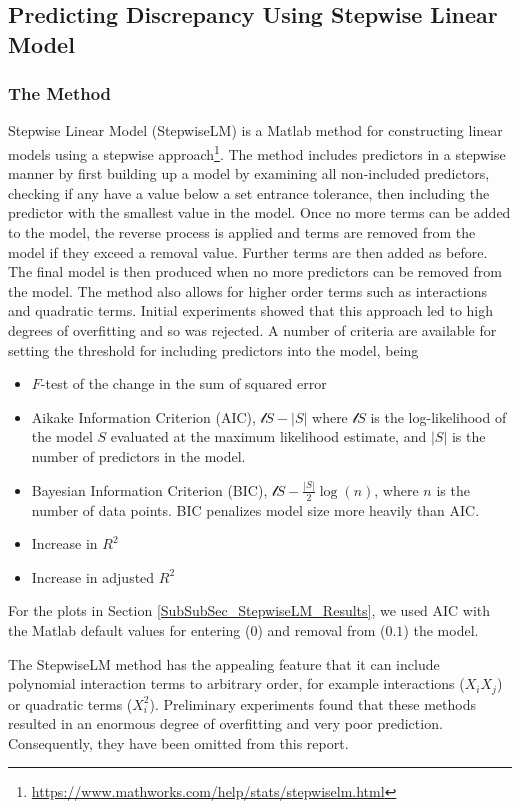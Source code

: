 \documentclass[11pt,a4paper,oneside]{article}
\begin{document}
\clearpage

\subsection{Predicting Discrepancy Using Stepwise Linear Model}\label{SubSec_StepwiseLM_Discrepancy}
\subsubsection{The Method}
Stepwise Linear Model (StepwiseLM) is a Matlab method for constructing linear models using a stepwise approach\footnote{\url{https://www.mathworks.com/help/stats/stepwiselm.html}}. The method includes predictors in a stepwise manner by first building  up a model by examining all non-included predictors, checking if any have a value below a set entrance tolerance, then including the predictor with the smallest value in the model. Once no more terms can be added to the model, the reverse process is applied and terms are removed from the model if they exceed a removal value. Further terms are then added as before. The final model is then produced when no more predictors can be removed from the model. The method also allows for higher order terms such as interactions and quadratic terms. Initial experiments showed that this approach led to high degrees of overfitting and so was rejected. A number of criteria are available for setting the threshold for including predictors into the model\cite{Wasserman2010}, being
\begin{itemize}
\item $F$-test of the change in the sum of squared error 
\item Aikake Information Criterion (AIC), $\mathcal{l}S-|S|$ where $\mathcal{l}S$ is the log-likelihood of the model $S$ evaluated at the maximum likelihood estimate, and $|S|$ is the number of predictors in the model.
\item Bayesian Information Criterion (BIC), $\mathcal{l}S-\frac{|S|}{2} \log( n )$, where $n$ is the number of data points. BIC penalizes model size more heavily than AIC.
\item Increase in $R^2$
\item Increase in adjusted $R^2$
\end{itemize}
For the plots in Section \ref{SubSubSec_StepwiseLM_Results}, we used AIC with the Matlab default values for entering ($0$) and removal from ($0.1$) the model. 

The StepwiseLM method has the appealing feature that it can include polynomial interaction terms to arbitrary order, for example interactions ($X_iX_j$) or quadratic terms ($X_i^2$). Preliminary experiments found that these methods resulted in an enormous degree of overfitting and very poor prediction. Consequently, they have been omitted from this report.
\end{document}
